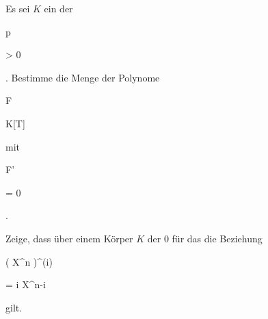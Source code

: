 {


Es sei $K$ ein
der


\mavergleichskette

{\vergleichskette

{p
}

{ > }{ 0
}

{  }{
}

{    }{
}

{   }{
}

}
{}{}{.}
Bestimme die Menge der Polynome


\mavergleichskette

{\vergleichskette

{F
}

{ \in }{ K[T]
}

{  }{
}

{    }{
}

{   }{
}

}
{}{}{}
mit


\mavergleichskette

{\vergleichskette

{F'
}

{ = }{ 0
}

{  }{
}

{    }{
}

{   }{
}

}
{}{}{.}


}

{} {}



{}

{


Zeige, dass über einem Körper $K$ der
$0$ für das
die Beziehung
 {} {}


\mavergleichskettedisp

{\vergleichskette

{ {  } \left(  X^n  \right)^{(i)}
}

{ =} {  { i }  X^{n-i}
}

{ } {
}

{ } {
}

{ } {
}

}
{}{}{}
gilt.


}

